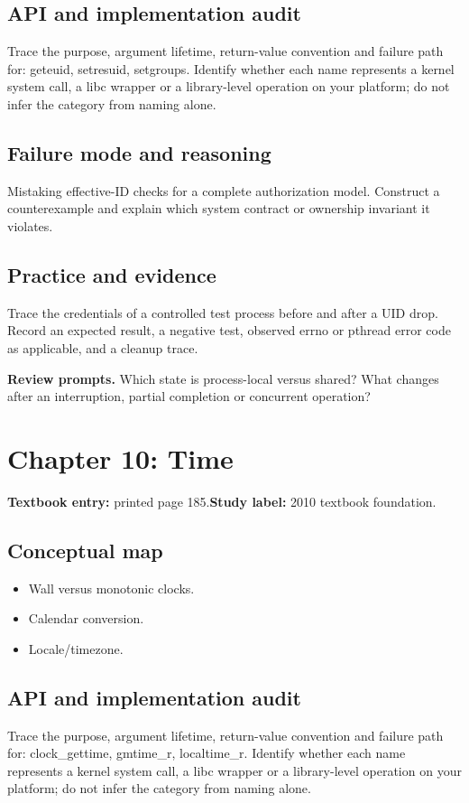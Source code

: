 \documentclass[11pt,letterpaper,oneside]{report}
\begin{document}
\subsection{API and implementation audit}
Trace the purpose, argument lifetime, return-value convention and failure path for: geteuid, setresuid, setgroups. Identify whether each name represents a kernel system call, a libc wrapper or a library-level operation on your platform; do not infer the category from naming alone.

\subsection{Failure mode and reasoning}
Mistaking effective-ID checks for a complete authorization model. Construct a counterexample and explain which system contract or ownership invariant it violates.

\subsection{Practice and evidence}
Trace the credentials of a controlled test process before and after a UID drop. Record an expected result, a negative test, observed errno or pthread error code as applicable, and a cleanup trace.

\textbf{Review prompts.} Which state is process-local versus shared? What changes after an interruption, partial completion or concurrent operation?

\section{Chapter 10: Time}
\textbf{Textbook entry:} printed page 185.\quad \textbf{Study label:} 2010 textbook foundation.

\subsection{Conceptual map}
\begin{itemize}
\item Wall versus monotonic clocks.
\item Calendar conversion.
\item Locale/timezone.
\end{itemize}
\subsection{API and implementation audit}
Trace the purpose, argument lifetime, return-value convention and failure path for: clock\_gettime, gmtime\_r, localtime\_r. Identify whether each name represents a kernel system call, a libc wrapper or a library-level operation on your platform; do not infer the category from naming alone.
\end{document}
